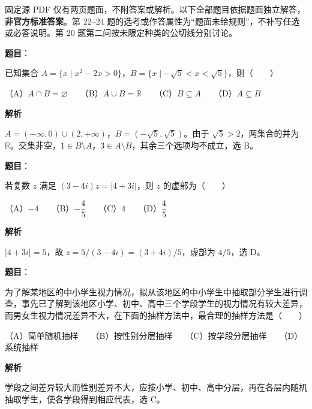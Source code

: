

\begin{gktip}
固定源 PDF 仅有两页题面，不附答案或解析。以下全部题目依据题面独立解答，\textbf{非官方标准答案}。第 22–24 题的选考或作答属性为“题面未给规则”，不补写任选或必答说明。第 20 题第二问按未限定种类的公切线分别讨论。
\end{gktip}


\begin{answer}

\textbf{题目}：

已知集合 $A=\{x\mid x^2-2x>0\}$，$B=\{x\mid-\sqrt5<x<\sqrt5\}$，则\mbox{（　　）}

（A）$A\cap B=\varnothing$　　（B）$A\cup B=\mathbb R$　　（C）$B\subseteq A$　　（D）$A\subseteq B$

\textbf{解析}

$A=(-\infty,0)\cup(2,+\infty)$，$B=(-\sqrt5,\sqrt5)$。由于 $\sqrt5>2$，两集合的并为 $\mathbb R$。交集非空，$1\in B\setminus A$，$3\in A\setminus B$，其余三个选项均不成立，选 B。


\end{answer}
\begin{answer}

\textbf{题目}：

若复数 $z$ 满足 $(3-4i)z=|4+3i|$，则 $z$ 的虚部为\mbox{（　　）}

（A）$-4$　　（B）$-\dfrac45$　　（C）$4$　　（D）$\dfrac45$

\textbf{解析}

$|4+3i|=5$，故 $z=5/(3-4i)=(3+4i)/5$，虚部为 $4/5$，选 D。


\end{answer}
\begin{answer}

\textbf{题目}：

为了解某地区的中小学生视力情况，拟从该地区的中小学生中抽取部分学生进行调查，事先已了解到该地区小学、初中、高中三个学段学生的视力情况有较大差异，而男女生视力情况差异不大，在下面的抽样方法中，最合理的抽样方法是\mbox{（　　）}

（A）简单随机抽样　　（B）按性别分层抽样　　（C）按学段分层抽样　　（D）系统抽样

\textbf{解析}

学段之间差异较大而性别差异不大，应按小学、初中、高中分层，再在各层内随机抽取学生，使各学段得到相应代表，选 C。


\end{answer}
